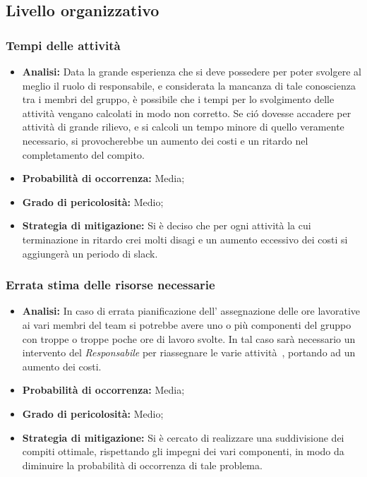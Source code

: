 \subsection{Livello organizzativo}
\subsubsection{Tempi delle attività}
	\begin{itemize}
	\item \textbf{Analisi: }Data la grande esperienza che si deve possedere per poter svolgere al meglio il ruolo di responsabile, e considerata la mancanza di tale conoscienza tra i membri del gruppo, è possibile che i tempi per lo svolgimento delle attività vengano calcolati in modo non corretto. Se ci\'o dovesse accadere per attività di grande rilievo, e si calcoli un tempo minore di quello veramente necessario, si provocherebbe un aumento dei costi e un ritardo nel completamento del compito.
	\item \textbf{Probabilità di occorrenza:} Media;
	\item \textbf{Grado di pericolosità:} Medio;
	\item \textbf{Strategia di mitigazione: }Si è deciso che per ogni attività la cui terminazione in ritardo crei molti disagi e un aumento eccessivo dei costi si aggiungerà un periodo di slack.
	\end{itemize}
\subsubsection{Errata stima delle risorse necessarie}
	\begin{itemize}
	\item \textbf{Analisi: }In caso di errata pianificazione dell' assegnazione delle ore lavorative ai vari membri del team si potrebbe avere uno o più componenti del gruppo con troppe o troppe poche ore di lavoro svolte. In tal caso sarà necessario un intervento del \textit{Responsabile} per riassegnare le varie attività~, portando ad un aumento dei costi.
	\item \textbf{Probabilità di occorrenza:} Media;
	\item \textbf{Grado di pericolosità:} Medio;
	\item \textbf{Strategia di mitigazione: }Si è cercato di realizzare una suddivisione dei compiti ottimale, rispettando gli impegni dei vari componenti, in modo da diminuire la probabilità di occorrenza di tale problema.
	\end{itemize}
